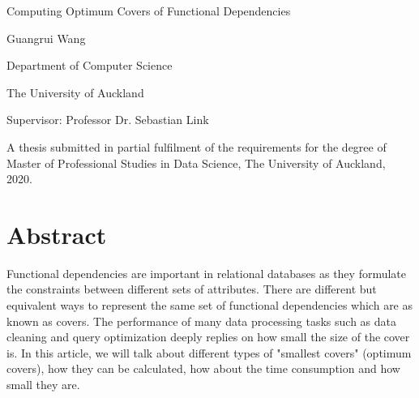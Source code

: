 \documentclass[11pt]{book}
\begin{document}
\pagestyle{empty}


\begin{center}

\vspace{1cm}

{\Huge Computing Optimum Covers of Functional Dependencies}

\vspace{75mm} 

{\Large Guangrui Wang}

\vspace{1ex}

Department of Computer Science

The University of Auckland

\vspace{5ex}

Supervisor: Professor Dr. Sebastian Link

\vspace*{60mm}

A thesis submitted in partial fulfilment of the requirements for the degree of Master of Professional Studies in Data Science, The University of Auckland, 2020.

\end{center}




\chapter*{Abstract}       
\setcounter{page}{1}
\pagestyle{headings}


Functional dependencies are important in relational databases as they formulate the constraints between different sets of attributes. There are different but equivalent ways to represent the same set of functional dependencies which are as known as covers. The performance of many data processing tasks such as data cleaning and query optimization deeply replies on how small the size of the cover is. In this article, we will talk about different types of "smallest covers" (optimum covers), how they can be calculated, how about the time consumption and how small they are.
\end{document}
